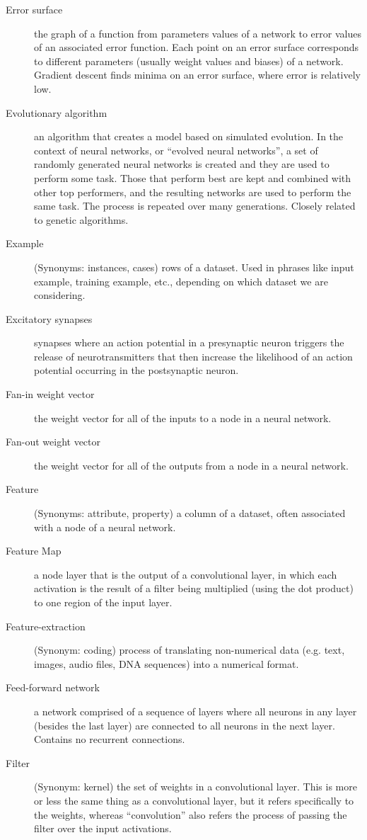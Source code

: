 \begin{description}
\item[Error surface] the graph of a function from parameters values of a network to error values of an associated error function. Each point on an error surface corresponds to different parameters (usually weight values and biases) of a network. Gradient descent finds minima on an error surface, where error is relatively low.
\item[Evolutionary algorithm] an algorithm that creates a model based on simulated evolution. In the context of neural networks, or ``evolved neural networks'', a set of randomly generated neural networks is created and they are used to perform some task.  Those that perform best are kept and combined with other top performers, and the resulting networks are used to perform the same task. The process is repeated over many generations. Closely related to genetic algorithms.
\item[Example] (Synonyms: instances, cases) rows of a dataset. Used in phrases like input example, training example, etc., depending on which dataset we are considering.
\item[Excitatory synapses] synapses where an action potential in a presynaptic neuron triggers the release of neurotransmitters that then increase the likelihood of an action potential occurring in the postsynaptic neuron.
\item[Fan-in weight vector] the weight vector for all of the inputs to a node in a neural network.
\item[Fan-out weight vector] the weight vector for all of the outputs from a node in a neural network.
\item[Feature] (Synonyms: attribute, property) a column of a dataset, often associated with a node of a neural network.
\item[Feature Map] a node layer that is the output of a convolutional layer, in which each activation is the result of a filter being multiplied (using the dot product) to one region of the input layer.
\item[Feature-extraction] (Synonym:  coding)  process of translating non-numerical data (e.g. text, images, audio files, DNA sequences) into a numerical format. %
\item[Feed-forward network] a network comprised of a sequence of layers where all neurons in any layer (besides the last layer) are connected to all neurons in the next layer. Contains no recurrent connections.
\item[Filter] (Synonym: kernel) the set of weights in a convolutional layer. This is more or less the same thing as a convolutional layer, but it refers specifically to the weights, whereas ``convolution'' also refers the process of passing the filter over the input activations.

\end{description}
